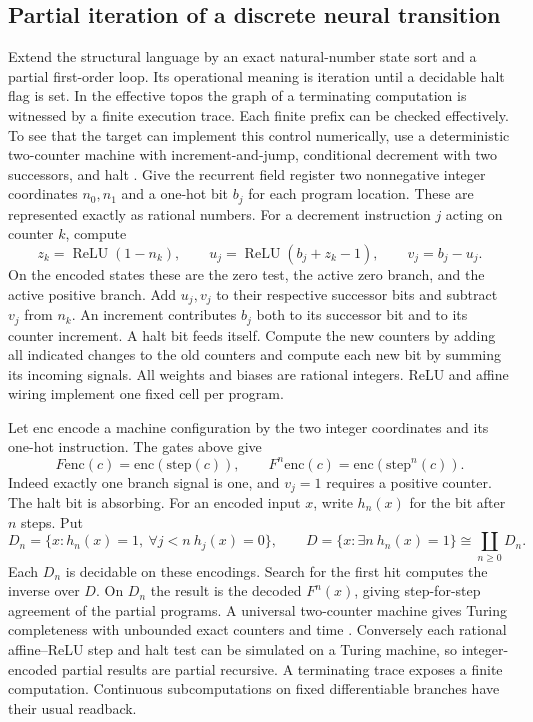\documentclass[11pt,a4paper]{article}
\theoremstyle{definition}
\theoremstyle{remark}\newaliascnt{remark}{theorem}
\numberwithin{equation}{section}
\begin{document}
\subsection{Partial iteration of a discrete neural transition}

Extend the structural language by an exact natural-number state sort and a partial first-order loop. Its operational meaning is iteration until a decidable halt flag is set. In the effective topos the graph of a terminating computation is witnessed by a finite execution trace. Each finite prefix can be checked effectively. To see that the target can implement this control numerically, use a deterministic two-counter machine with increment-and-jump, conditional decrement with two successors, and halt \cite{counter}. Give the recurrent field register two nonnegative integer coordinates $n_0,n_1$ and a one-hot bit $b_j$ for each program location. These are represented exactly as rational numbers. For a decrement instruction $j$ acting on counter $k$, compute
\[
 z_k=\operatorname{ReLU}(1-n_k),\qquad
 u_j=\operatorname{ReLU}(b_j+z_k-1),\qquad v_j=b_j-u_j .
\]
On the encoded states these are the zero test, the active zero branch, and the active positive branch. Add $u_j,v_j$ to their respective successor bits and subtract $v_j$ from $n_k$. An increment contributes $b_j$ both to its successor bit and to its counter increment. A halt bit feeds itself. Compute the new counters by adding all indicated changes to the old counters and compute each new bit by summing its incoming signals. All weights and biases are rational integers. ReLU and affine wiring implement one fixed cell per program.

Let \(\mathrm{enc}\) encode a machine configuration by the two integer coordinates and its one-hot instruction. The gates above give
\[
 F\mathrm{enc}(c)=\mathrm{enc}(\mathrm{step}(c)),\qquad
 F^n\mathrm{enc}(c)=\mathrm{enc}(\mathrm{step}^n(c)).
\]
Indeed exactly one branch signal is one, and \(v_j=1\) requires a positive counter. The halt bit is absorbing. For an encoded input \(x\), write \(h_n(x)\) for the bit after \(n\) steps. Put
\[
 D_n=\{x:h_n(x)=1,\ \forall j<n\ h_j(x)=0\},\qquad
 D=\{x:\exists n\ h_n(x)=1\}\cong\coprod_{n\ge0}D_n .
\]
Each \(D_n\) is decidable on these encodings. Search for the first hit computes the inverse over \(D\). On \(D_n\) the result is the decoded \(F^n(x)\), giving step-for-step agreement of the partial programs. A universal two-counter machine gives Turing completeness with unbounded exact counters and time \cite{counter}. Conversely each rational affine--ReLU step and halt test can be simulated on a Turing machine, so integer-encoded partial results are partial recursive. A terminating trace exposes a finite computation. Continuous subcomputations on fixed differentiable branches have their usual readback.
\end{document}
